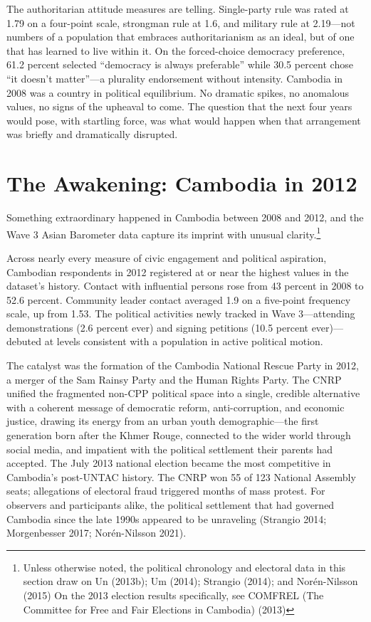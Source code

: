\documentclass[
  12pt,
  letterpaper]{article}
\begin{document}
The authoritarian attitude measures are telling. Single-party rule was
rated at 1.79 on a four-point scale, strongman rule at 1.6, and military
rule at 2.19---not numbers of a population that embraces
authoritarianism as an ideal, but of one that has learned to live within
it. On the forced-choice democracy preference, 61.2 percent selected
``democracy is always preferable'' while 30.5 percent chose ``it doesn't
matter''---a plurality endorsement without intensity. Cambodia in 2008
was a country in political equilibrium. No dramatic spikes, no anomalous
values, no signs of the upheaval to come. The question that the next
four years would pose, with startling force, was what would happen when
that arrangement was briefly and dramatically disrupted.

\section{The Awakening: Cambodia in
2012}\label{the-awakening-cambodia-in-2012}

Something extraordinary happened in Cambodia between 2008 and 2012, and
the Wave 3 Asian Barometer data capture its imprint with unusual
clarity.\footnote{Unless otherwise noted, the political chronology and
  electoral data in this section draw on Un (2013b); Um (2014); Strangio
  (2014); and Norén-Nilsson (2015) On the 2013 election results
  specifically, see COMFREL (The Committee for Free and Fair Elections
  in Cambodia) (2013)}

Across nearly every measure of civic engagement and political
aspiration, Cambodian respondents in 2012 registered at or near the
highest values in the dataset's history. Contact with influential
persons rose from 43 percent in 2008 to 52.6 percent. Community leader
contact averaged 1.9 on a five-point frequency scale, up from 1.53. The
political activities newly tracked in Wave 3---attending demonstrations
(2.6 percent ever) and signing petitions (10.5 percent ever)---debuted
at levels consistent with a population in active political motion.

The catalyst was the formation of the Cambodia National Rescue Party in
2012, a merger of the Sam Rainsy Party and the Human Rights Party. The
CNRP unified the fragmented non-CPP political space into a single,
credible alternative with a coherent message of democratic reform,
anti-corruption, and economic justice, drawing its energy from an urban
youth demographic---the first generation born after the Khmer Rouge,
connected to the wider world through social media, and impatient with
the political settlement their parents had accepted. The July 2013
national election became the most competitive in Cambodia's post-UNTAC
history. The CNRP won 55 of 123 National Assembly seats; allegations of
electoral fraud triggered months of mass protest. For observers and
participants alike, the political settlement that had governed Cambodia
since the late 1990s appeared to be unraveling (Strangio 2014;
Morgenbesser 2017; Norén-Nilsson 2021).
\end{document}
